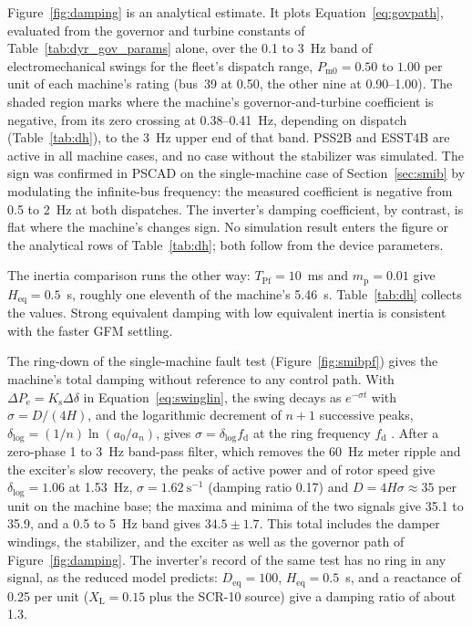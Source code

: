\documentclass[11pt]{article}
\begin{document}
Figure~\ref{fig:damping} is an analytical estimate. It plots Equation~\eqref{eq:govpath}, evaluated from the governor and turbine constants of Table~\ref{tab:dyr_gov_params} alone, over the 0.1 to 3~Hz band of electromechanical swings for the fleet's dispatch range, $P_{\mathrm{m0}}=0.50$ to $1.00$ per unit of each machine's rating (bus~39 at 0.50, the other nine at 0.90--1.00). The shaded region marks where the machine's governor-and-turbine coefficient is negative, from its zero crossing at 0.38--0.41~Hz, depending on dispatch (Table~\ref{tab:dh}), to the 3~Hz upper end of that band. PSS2B and ESST4B are active in all machine cases, and no case without the stabilizer was simulated. The sign was confirmed in PSCAD on the single-machine case of Section~\ref{sec:smib} by modulating the infinite-bus frequency: the measured coefficient is negative from 0.5 to 2~Hz at both dispatches. The inverter's damping coefficient, by contrast, is flat where the machine's changes sign. No simulation result enters the figure or the analytical rows of Table~\ref{tab:dh}; both follow from the device parameters.

The inertia comparison runs the other way: $T_{\mathrm{Pf}}=10$~ms and $m_{\mathrm{p}}=0.01$ give $H_{\mathrm{eq}}=0.5$~s, roughly one eleventh of the machine's 5.46~s. Table~\ref{tab:dh} collects the values. Strong equivalent damping with low equivalent inertia is consistent with the faster GFM settling.

The ring-down of the single-machine fault test (Figure~\ref{fig:smibpf}) gives the machine's total damping without reference to any control path. With $\Delta P_{\mathrm{e}}=K_{\mathrm{s}}\Delta\delta$ in Equation~\eqref{eq:swinglin}, the swing decays as $e^{-\sigma t}$ with $\sigma=D/(4H)$, and the logarithmic decrement of $n+1$ successive peaks, $\delta_{\log}=(1/n)\ln(a_{0}/a_{n})$, gives $\sigma=\delta_{\log}f_{\mathrm{d}}$ at the ring frequency $f_{\mathrm{d}}$ \cite[Sec.~2.6.3]{rao2011}. After a zero-phase 1 to 3~Hz band-pass filter, which removes the 60~Hz meter ripple and the exciter's slow recovery, the peaks of active power and of rotor speed give $\delta_{\log}=1.06$ at 1.53~Hz, $\sigma=1.62~\mathrm{s^{-1}}$ (damping ratio 0.17) and $D=4H\sigma\approx35$ per unit on the machine base; the maxima and minima of the two signals give 35.1 to 35.9, and a 0.5 to 5~Hz band gives $34.5\pm1.7$. This total includes the damper windings, the stabilizer, and the exciter as well as the governor path of Figure~\ref{fig:damping}.  The inverter's record of the same test has no ring in any signal, as the reduced model predicts: $D_{\mathrm{eq}}=100$, $H_{\mathrm{eq}}=0.5$~s, and a  reactance of 0.25 per unit ($X_{\mathrm{L}}=0.15$ plus the SCR-10 source) give a damping ratio of about 1.3.
\end{document}
